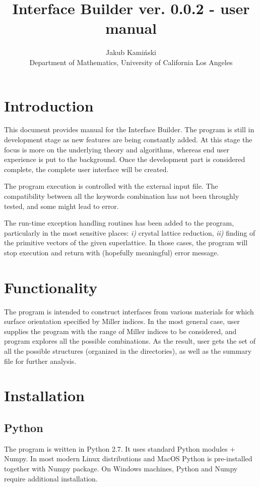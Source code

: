 \documentclass[a4paper,12pt,oneside]{article}
\begin{document}
\title{Interface Builder ver. 0.0.2 - user manual}
\author{Jakub Kami{\'n}ski
\\
Department of Mathematics,
University of California Los Angeles \\
}
\maketitle
\section{Introduction}
This document provides manual for the Interface Builder. The program is still in
development stage as new features are being constantly added. At this stage the
focus is more on the underlying theory and algorithms, whereas end user
experience is put to the background. Once the development part is considered
complete, the complete user interface will be created. 

The program execution is controlled with the external input file.  
The compatibility between all the keywords combination has not been throughly 
tested, and some might lead to error.

The run-time exception handling routines has been added to the program,
particularly in the
most sensitive places: \textit{i)} crystal lattice reduction, \textit{ii)}
finding of the primitive vectors of the given superlattice. In those cases, the
program will stop execution and return with (hopefully meaningful) error
message. 
\section{Functionality} 
The program is intended to construct interfaces from various materials for which
surface orientation specified by Miller indices. In the most general case, user
supplies the program with the range of Miller indices to be considered,
and program explores all the possible combinations. As the result, user gets the
set of all the possible structures (organized in the directories), as well as
the summary file for further analysis.

\section{Installation}
\subsection{Python}
The program is written in Python 2.7. It uses standard Python modules + Numpy. 
In most modern Linux distributions and MacOS Python is pre-installed together
with Numpy package. On Windows machines, Python and Numpy require additional
installation.
\end{document}
